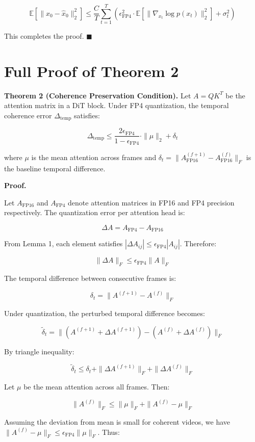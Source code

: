 \documentclass[journal]{IEEEtran}
\theoremstyle{definition}
\theoremstyle{remark}
\newcommand{\EE}{\mathbb{E}}
\begin{document}
\[
\EE[\|x_0 - \hat{x}_0\|_2^2] \leq \frac{C}{T} \sum_{t=1}^T \left( \epsilon_{\text{FP4}}^2 \cdot \EE[\|\nabla_{x_t} \log p(x_t)\|_2^2] + \sigma_t^2 \right)
\]

This completes the proof. \hfill $\blacksquare$

\section{Full Proof of Theorem 2}
\label{app:b}

\textbf{Theorem 2 (Coherence Preservation Condition).} 
Let $A = QK^T$ be the attention matrix in a DiT block. Under FP4 quantization, the temporal coherence error $\Delta_{\text{temp}}$ satisfies:

\[
\Delta_{\text{temp}} \leq \frac{2\epsilon_{\text{FP4}}}{1 - \epsilon_{\text{FP4}}} \cdot \|\mu\|_2 + \delta_t
\]

where $\mu$ is the mean attention across frames and $\delta_t = \|A_{\text{FP16}}^{(f+1)} - A_{\text{FP16}}^{(f)}\|_F$ is the baseline temporal difference.

\textbf{Proof.}

Let $A_{\text{FP16}}$ and $A_{\text{FP4}}$ denote attention matrices in FP16 and FP4 precision respectively. The quantization error per attention head is:

\[
\Delta A = A_{\text{FP4}} - A_{\text{FP16}}
\]

From Lemma 1, each element satisfies $|\Delta A_{ij}| \leq \epsilon_{\text{FP4}} |A_{ij}|$. Therefore:

\[
\|\Delta A\|_F \leq \epsilon_{\text{FP4}} \|A\|_F
\]

The temporal difference between consecutive frames is:

\[
\delta_t = \|A^{(f+1)} - A^{(f)}\|_F
\]

Under quantization, the perturbed temporal difference becomes:

\[
\tilde{\delta}_t = \|(A^{(f+1)} + \Delta A^{(f+1)}) - (A^{(f)} + \Delta A^{(f)})\|_F
\]

By triangle inequality:

\[
\tilde{\delta}_t \leq \delta_t + \|\Delta A^{(f+1)}\|_F + \|\Delta A^{(f)}\|_F
\]

Let $\mu$ be the mean attention across all frames. Then:

\[
\|A^{(f)}\|_F \leq \|\mu\|_F + \|A^{(f)} - \mu\|_F
\]

Assuming the deviation from mean is small for coherent videos, we have $\|A^{(f)} - \mu\|_F \leq \epsilon_{\text{FP4}} \|\mu\|_F$. Thus:
\end{document}
